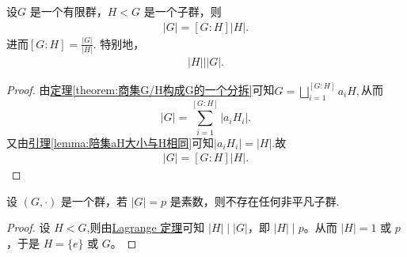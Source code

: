\documentclass[../../main.tex]{subfiles}
\begin{document}
\begin{theorem}[Lagrange定理]\label{theorem:Lagrange定理}
设\(G\) 是一个有限群，\(H < G\) 是一个子群，则
\begin{align*}
|G| = [G : H]|H|.
\end{align*}
进而$[G : H]=\frac{|G|}{|H|}$.
特别地，
\begin{align*}
|H| \Big| |G|.
\end{align*} 
\end{theorem}
\begin{proof}
由\hyperref[theorem:商集G/H构成G的一个分拆]{定理\ref{theorem:商集G/H构成G的一个分拆}}可知$G=\bigsqcup_{i=1}^{\left[ G:H \right]}{a_iH},$从而
\[
\left| G \right|=\sum_{i=1}^{\left[ G:H \right]}{\left|a_iH_i\right|}.
\]
又由\hyperref[lemma:陪集aH大小与H相同]{引理\ref{lemma:陪集aH大小与H相同}}可知$\left|a_iH_i\right|=\left|H\right|$.故\begin{align*}
|G| = [G : H]|H|.
\end{align*}

\end{proof}

\begin{example}
设 $(G,\cdot)$ 是一个群，若 $|G| = p$ 是素数，则不存在任何非平凡子群.
\end{example}
\begin{proof}
设 $H < G$,则由\hyperref[theorem:Lagrange定理]{Lagrange 定理}可知 $|H|\mid |G|$，即 $|H|\mid p$。从而 $|H| = 1$ 或 $p$，于是 $H = \{e\}$ 或 $G$。 

\end{proof}
\end{document}
